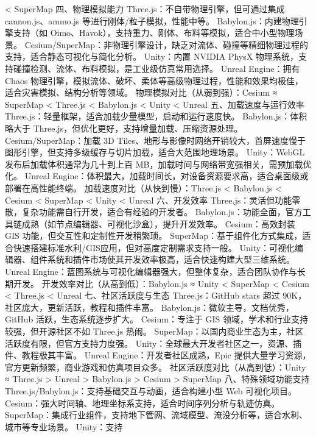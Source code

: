 {\textless{} SuperMap 四、物理模拟能力 Three.js：不自带物理引擎，但可通过集成 cannon.js、ammo.js 等进行刚体/粒子模拟，性能中等。 Babylon.js：内建物理引擎支持（如
Oimo、Havok），支持重力、刚体、布料等模拟，适合中小型物理场景。 Cesium/SuperMap：非物理引擎设计，缺乏对流体、碰撞等精细物理过程的支持，适合静态可视化与简化分析。 Unity：内置 NVIDIA PhysX
物理系统，支持碰撞检测、流体、布料模拟，是工业级仿真常用选择。 Unreal Engine：拥有 Chaos 物理引擎，模拟流体、破坏、柔体等高级物理过程，性能和效果均极佳，适合灾害模拟、结构分析等领域。
物理模拟对比（从弱到强）：Cesium ≈ SuperMap \textless{} Three.js \textless{} Babylon.js \textless{} Unity \textless{} Unreal
五、加载速度与运行效率 Three.js：轻量框架，适合加载少量模型，启动和运行速度快。 Babylon.js：体积略大于 Three.js，但优化更好，支持增量加载、压缩资源处理。 Cesium/SuperMap：加载 3D
Tiles、地形与影像时网络开销较大，首屏速度慢于图形引擎，但支持多级缓存与切片加载，适合大范围地理场景。 Unity：WebGL 发布后加载体积通常为几十到上百 MB，加载时间与网络带宽强相关，需预加载优化。 Unreal
Engine：体积最大，加载时间长，对设备资源要求高，适合桌面级或部署在高性能终端。 加载速度对比（从快到慢）：Three.js \textless{} Babylon.js \textless{} Cesium \textless{}
SuperMap \textless{} Unity \textless{} Unreal 六、开发效率 Three.js：灵活但功能零散，复杂功能需自行开发，适合有经验的开发者。
Babylon.js：功能全面，官方工具链成熟（如节点编辑器、可视化沙盒），提升开发效率。 Cesium：高效封装 GIS 功能，但交互性和定制性开发稍繁琐。
SuperMap：基于组件化方式集成，适合快速搭建标准水利/GIS应用，但对高度定制需求支持一般。 Unity：可视化编辑器、组件系统和插件市场使其开发效率极高，适合快速构建大型三维系统。 Unreal
Engine：蓝图系统与可视化编辑器强大，但整体复杂，适合团队协作与长期开发。 开发效率对比（从高到低）：Babylon.js ≈ Unity \textless{} SuperMap \textless{} Cesium
\textless{} Three.js \textless{} Unreal 七、社区活跃度与生态 Three.js：GitHub stars 超过 90K，社区庞大，更新活跃，教程和插件丰富。
Babylon.js：微软主导，文档优秀，GitHub 活跃，生态系统逐步扩大。 Cesium：专注于 GIS 领域，学术和行业支持较强，但开源社区不如 Three.js 热闹。
SuperMap：以国内商业生态为主，社区活跃度有限，但官方支持力度强。 Unity：全球最大开发者社区之一，资源、插件、教程极其丰富。 Unreal Engine：开发者社区成熟，Epic
提供大量学习资源，官方更新频繁，商业游戏和仿真项目众多。 社区活跃度对比（从高到低）：Unity ≈ Three.js \textgreater{} Unreal \textgreater{} Babylon.js
\textgreater{} Cesium \textgreater{} SuperMap 八、特殊领域功能支持 Three.js/Babylon.js：支持基础交互与动画，适合构建小型 Web 可视化项目。
Cesium：强大时间轴、地理坐标系支持，适合时间序列分析与轨迹仿真。 SuperMap：集成行业组件，支持地下管网、流域模型、淹没分析等，适合水利、城市等专业场景。 Unity：支持
}
